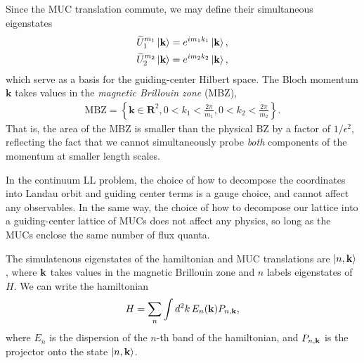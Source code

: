 \documentclass[aps,prb,twocolumn,letterpaper,twoside,nobalancelastpage,groupedaddress,amsmath,amssymb,floatfix,citeautoscript]{revtex4-1}
\begin{document}
Since the MUC translation commute, we may define their simultaneous eigenstates
\begin{align*}
\widetilde{U}_1^{m_1}\ket{\mathbf{k}}&=e^{im_1 k_1}\ket{\mathbf{k}},\\
\widetilde{U}_2^{m_2}\ket{\mathbf{k}}&=e^{im_2 k_2}\ket{\mathbf{k}},\\
\end{align*}
which serve as a basis for the guiding-center Hilbert space. The Bloch momentum $\mathbf{k}$ takes values in the \textit{magnetic Brillouin zone} (MBZ),
\begin{align*}
\text{MBZ} = \left\{\mathbf{k}\in\mathbf{R}^2, 0<k_1<\frac{2\pi}{m_1},0<k_2<\frac{2\pi}{m_2}\right\}.
\end{align*}
That is, the area of the MBZ is smaller than the physical BZ by a factor of $1/\epsilon^2$, reflecting the fact that we cannot simultaneously probe \textit{both} components of the momentum at smaller length scales.

In the continuum LL problem, the choice of how to decompose the coordinates into Landau orbit and guiding center terms is a gauge choice, and cannot affect any observables. In the same way, the choice of how to decompose our lattice into a guiding-center lattice of MUCs does not affect any physics, so long as the MUCs enclose the same number of flux quanta.

The simulatenous eigenstates of the hamiltonian and MUC translations are $\ket{n,{\bf k}}$, where ${\bf k}$ takes values in the magnetic Brillouin zone and $n$ labels eigenstates of $H$. We can write the hamiltonian 
\begin{align}
\label{band-projector-ham}
H = \sum_{n}\int d^2k\, E_{n}({\bf k}) P_{n,{\bf k}},
\end{align}
where $E_n$ is the dispersion of the $n$-th band of the hamiltonian, and $P_{n,{\bf k}}$ is the projector onto the state $\ket{n,{\bf k}}$.
\end{document}
